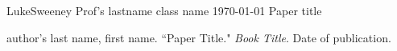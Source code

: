 \documentclass[letterpaper,12pt]{article}
\begin{document}
    \begin{mla}
        {Luke}{Sweeney}
        {Prof's lastname}
        {class name}
        {\today}
        {Paper title}

    \end{mla}

    \begin{workscited}
        \bibent author's last name, first name.  ``Paper Title."  \textit{Book Title}.  Date of publication.
    \end{workscited}
\end{document}
